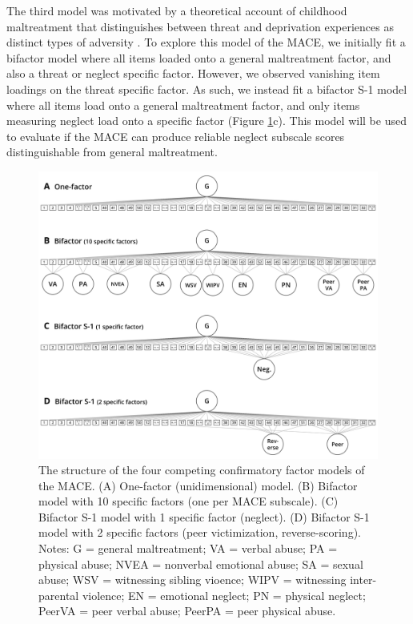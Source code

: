 \documentclass[letterpaper,man,natbib,floatsintext,longtable]{apa6}
\begin{document}
The third model was motivated by a theoretical account of childhood maltreatment that distinguishes between threat and deprivation experiences as distinct types of adversity \citep{mclaughlin2014childhood}. To explore this model of the MACE, we initially fit a bifactor model where all items loaded onto a general maltreatment factor, and also a threat or neglect specific factor. However, we observed vanishing item loadings on the threat specific factor. As such, we instead fit a bifactor S-1 model \citep{eid2017anomalous} where all items load onto a general maltreatment factor, and only items measuring neglect load onto a specific factor (Figure \ref{fig:models}c). This model will be used to evaluate if the MACE can produce reliable neglect subscale scores distinguishable from general maltreatment. 

\begin{figure}[t!]
    \centering
    \includegraphics[width=1.1\textwidth,center]{figures/fig01.png}
    \captionsetup{width=1.1\textwidth}
    \caption{\normalfont The structure of the four competing confirmatory factor models of the MACE. (A) One-factor (unidimensional) model. (B) Bifactor model with 10 specific factors (one per MACE subscale). (C) Bifactor S-1 model with 1 specific factor (neglect). (D) Bifactor S-1 model with 2 specific factors (peer victimization, reverse-scoring). Notes: G = general maltreatment; VA = verbal abuse; PA = physical abuse; NVEA = nonverbal emotional abuse; SA = sexual abuse; WSV = witnessing sibling vioence; WIPV = witnessing inter-parental violence; EN = emotional neglect; PN = physical neglect; PeerVA = peer verbal abuse; PeerPA = peer physical abuse.}
    \label{fig:models}
\end{figure}
\end{document}
